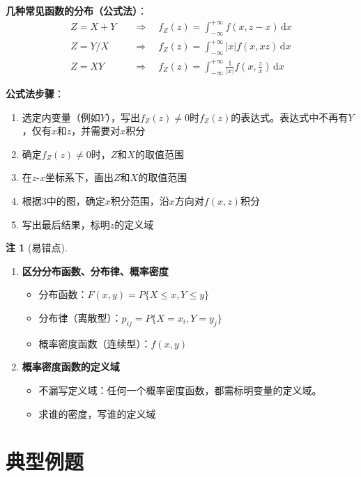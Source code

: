 \documentclass[11pt,a4paper]{report}
\theoremstyle{definition}
\newtheorem{remark}{注}[chapter]
\theoremstyle{plain}
\begin{document}
\textbf{几种常见函数的分布（公式法）}：
\[
\begin{aligned}
Z=X+Y &\quad\Rightarrow\quad f_Z(z)=\int_{-\infty}^{+\infty}f(x,z-x)\,\mathrm{d}x \\
Z=Y/X &\quad\Rightarrow\quad f_Z(z)=\int_{-\infty}^{+\infty}|x|f(x,xz)\,\mathrm{d}x \\
Z=XY &\quad\Rightarrow\quad f_Z(z)=\int_{-\infty}^{+\infty}\frac{1}{|x|}f\left(x,\frac{z}{x}\right)\,\mathrm{d}x
\end{aligned}
\]

\textbf{公式法步骤}：
\begin{enumerate}[label=\arabic*.,leftmargin=2em]
    \item 选定内变量（例如\(Y\)），写出\(f_Z(z)\neq 0\)时\(f_Z(z)\)的表达式。表达式中不再有\(Y\)，仅有\(x\)和\(z\)，并需要对\(x\)积分
    \item 确定\(f_Z(z)\neq 0\)时，\(Z\)和\(X\)的取值范围
    \item 在\(z\)-\(x\)坐标系下，画出\(Z\)和\(X\)的取值范围
    \item 根据3中的图，确定\(x\)积分范围，沿\(x\)方向对\(f(x,z)\)积分
    \item 写出最后结果，标明\(z\)的定义域
\end{enumerate}

\begin{remark}[易错点]
\begin{enumerate}[label=\arabic*.,leftmargin=2em]
    \item \textbf{区分分布函数、分布律、概率密度}
    \begin{itemize}
        \item 分布函数：\(F(x,y)=P\{X\leq x,Y\leq y\}\)
        \item 分布律（离散型）：\(p_{ij}=P\{X=x_i,Y=y_j\}\)
        \item 概率密度函数（连续型）：\(f(x,y)\)
    \end{itemize}
    \item \textbf{概率密度函数的定义域}
    \begin{itemize}
        \item 不漏写定义域：任何一个概率密度函数，都需标明变量的定义域。
        \item 求谁的密度，写谁的定义域
    \end{itemize}
\end{enumerate}
\end{remark}

\section{典型例题}
\end{document}
